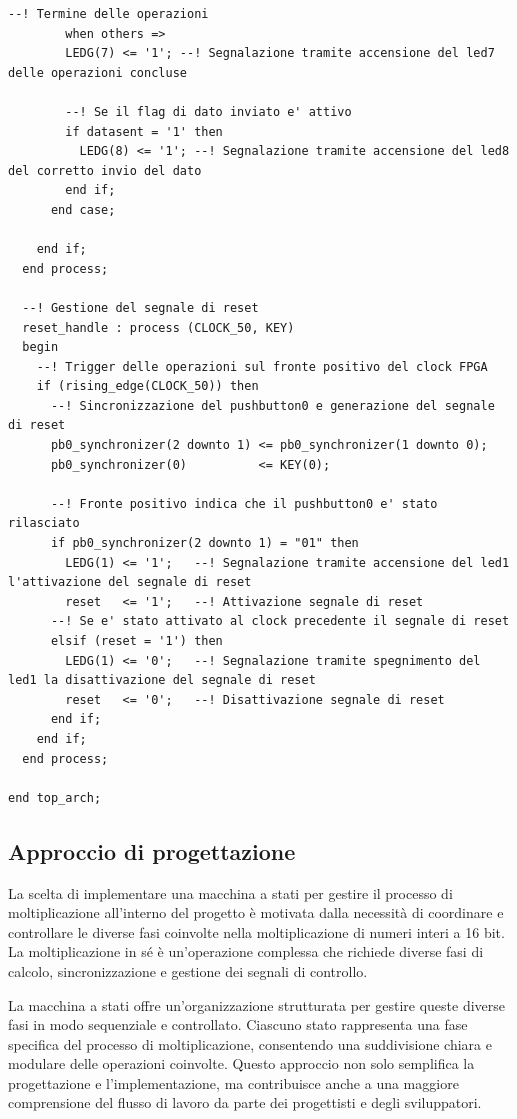 \documentclass[titlepage]{report}
\begin{document}
\begin{lstlisting}[caption={Processo principale del moltiplicatore}, label={lst:mul16_process}]
        --! Termine delle operazioni
        when others =>
        LEDG(7) <= '1'; --! Segnalazione tramite accensione del led7 delle operazioni concluse

        --! Se il flag di dato inviato e' attivo
        if datasent = '1' then
          LEDG(8) <= '1'; --! Segnalazione tramite accensione del led8 del corretto invio del dato
        end if;
      end case;

    end if;
  end process;

  --! Gestione del segnale di reset
  reset_handle : process (CLOCK_50, KEY)
  begin
    --! Trigger delle operazioni sul fronte positivo del clock FPGA
    if (rising_edge(CLOCK_50)) then
      --! Sincronizzazione del pushbutton0 e generazione del segnale di reset
      pb0_synchronizer(2 downto 1) <= pb0_synchronizer(1 downto 0);
      pb0_synchronizer(0)          <= KEY(0);

      --! Fronte positivo indica che il pushbutton0 e' stato rilasciato
      if pb0_synchronizer(2 downto 1) = "01" then
        LEDG(1) <= '1';   --! Segnalazione tramite accensione del led1 l'attivazione del segnale di reset
        reset   <= '1';   --! Attivazione segnale di reset
      --! Se e' stato attivato al clock precedente il segnale di reset
      elsif (reset = '1') then
        LEDG(1) <= '0';   --! Segnalazione tramite spegnimento del led1 la disattivazione del segnale di reset
        reset   <= '0';   --! Disattivazione segnale di reset
      end if;
    end if;
  end process;

end top_arch;
		\end{lstlisting}
		\subsection{Approccio di progettazione}
		\label{subsec:approccio_progettazione}
			La scelta di implementare una macchina a stati per gestire il processo di moltiplicazione all'interno del progetto è motivata dalla necessità di coordinare e controllare le diverse fasi coinvolte nella moltiplicazione di numeri interi a 16 bit. La moltiplicazione in sé è un'operazione complessa che richiede diverse fasi di calcolo, sincronizzazione e gestione dei segnali di controllo.

			La macchina a stati offre un'organizzazione strutturata per gestire queste diverse fasi in modo sequenziale e controllato. Ciascuno stato rappresenta una fase specifica del processo di moltiplicazione, consentendo una suddivisione chiara e modulare delle operazioni coinvolte. Questo approccio non solo semplifica la progettazione e l'implementazione, ma contribuisce anche a una maggiore comprensione del flusso di lavoro da parte dei progettisti e degli sviluppatori.
\end{document}
